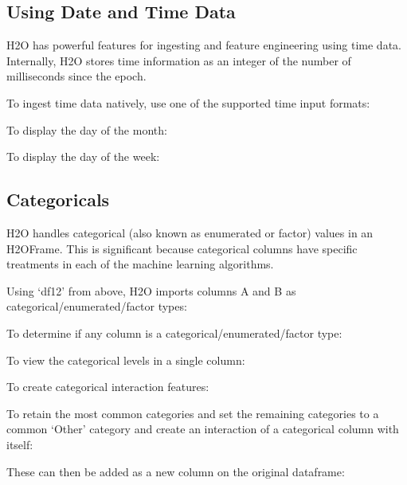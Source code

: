 {\subsection{Using Date and Time Data} 
H2O has powerful features for ingesting and feature engineering using time data.  Internally, H2O
stores time information as an integer of the number of milliseconds since the epoch.

To ingest time data natively, use one of the supported time input formats:


To display the day of the month:


To display the day of the week:


\subsection{Categoricals}
H2O handles categorical (also known as enumerated or factor) values in an H2OFrame.  This is significant because categorical
columns have specific treatments in each of the machine learning algorithms.

Using `df12' from above, H2O imports columns A and B as categorical/enumerated/factor types:


To determine if any column is a categorical/enumerated/factor type:


To view the categorical levels in a single column:


To create categorical interaction features:


\newpage
To retain the most common categories and set the remaining categories to a common `Other' category
 and create an interaction of a categorical column with itself:


These can then be added as a new column on the original dataframe:


}
